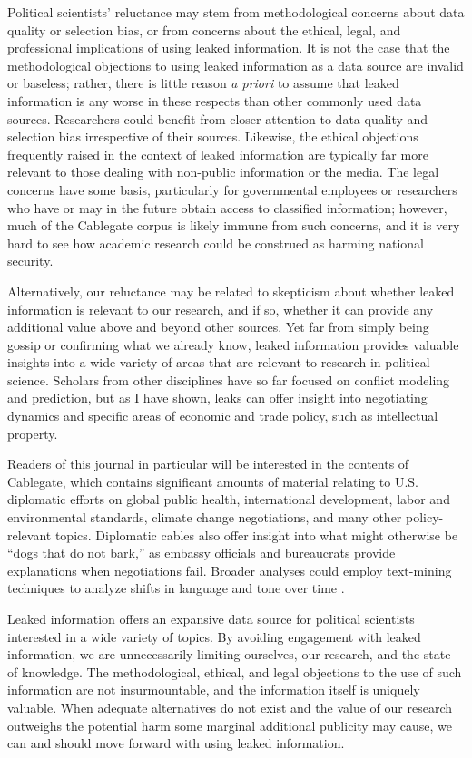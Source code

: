 \documentclass[12pt]{article}
\begin{document}
Political scientists' reluctance may stem from methodological concerns about data quality or selection 
bias, or from concerns about the ethical, legal, and professional implications of using leaked information. 
It is not the case that the methodological objections to using leaked information 
as a data source are invalid or baseless; rather, there is little reason \emph{a priori} to assume 
that leaked information is any worse in these respects than other commonly used data sources. 
Researchers could benefit from closer attention to data quality and 
selection bias irrespective of their sources.
Likewise, the ethical objections frequently raised in the context of leaked information are 
typically far more relevant to those dealing with non-public information or the media. The legal concerns have some basis, 
particularly for governmental employees or researchers who have or may in the future obtain access to 
classified information; however, much of the Cablegate corpus is likely immune from such concerns, 
and it is very hard to see how academic research could be construed as harming national security.

Alternatively, our reluctance may be related to skepticism about whether leaked information is relevant 
to our research, and if so, whether it can provide any additional value above and beyond other sources. 
Yet far from simply being gossip or confirming what we already know, leaked information provides 
valuable insights into a wide variety of areas that are relevant to research in political science. 
Scholars from other disciplines have so far focused on conflict modeling and prediction, but as I 
have shown, leaks can offer insight into negotiating dynamics and specific areas of economic and 
trade policy, such as intellectual property.

Readers of this journal in particular will be interested in the contents of Cablegate, which contains 
significant amounts of material relating to U.S. diplomatic efforts on global public health, international 
development, labor and environmental standards, climate change negotiations, and many other policy-relevant topics. 
Diplomatic cables also offer insight into what might otherwise be ``dogs that do not bark,'' as embassy officials and 
bureaucrats provide explanations when negotiations fail.
Broader analyses could employ text-mining techniques to analyze shifts in language and tone over 
time \citep{paruchuri2012tracking}.

Leaked information offers an expansive data source for political scientists interested in a wide variety of topics. 
By avoiding engagement with leaked information, we are unnecessarily limiting ourselves, our research, and 
the state of knowledge. The methodological, ethical, and legal objections to the use of such information 
are not insurmountable, and the information itself is uniquely valuable. When adequate alternatives 
do not exist and the value of our research outweighs the potential harm some marginal additional publicity may cause, 
we can and should move forward with using leaked information.
\end{document}
